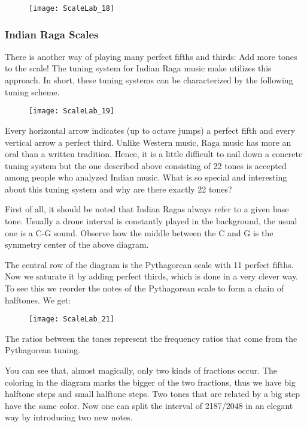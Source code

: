 \begin{figure}[h]
\centering
\texttt{[image: ScaleLab\_18]}
\end{figure}

\subsubsection{Indian Raga Scales}
There is another way of playing many perfect fifths and thirds: Add more tones to the scale!  The tuning system for Indian Raga music make utilizes this approach. In short, these tuning systems can be characterized by the following tuning scheme. 

\begin{figure}[h]
\centering
\texttt{[image: ScaleLab\_19]}
\end{figure}


Every horizontal arrow indicates (up to octave jumps) a perfect fifth and every vertical arrow a perfect third. Unlike Western music, Raga music has more an oral than a written tradition. Hence, it is a little difficult to nail down a concrete tuning system but the one described above consisting of 22 tones is accepted among people who analyzed Indian music. What is so special and interesting about this tuning system and why are there exactly 22 tones? 

First of all, it should be noted that Indian Ragas always refer to a given base tone. Usually a drone interval is constantly played in the background, the usual one is a C-G sound. Observe how the middle between the C and G is the symmetry center of the above diagram.

The central row of the diagram is the Pythagorean scale with 11 perfect fifths. Now we saturate it by adding perfect thirds, which is done in a very clever way. To see this we reorder the notes of the Pythagorean scale to form a chain of halftones. We get:

\begin{figure}[h]
\centering
\texttt{[image: ScaleLab\_21]}
\end{figure}

The ratios between the tones represent the frequency ratios that come from the Pythagorean tuning. 

You can see that, almost magically, only two kinds of fractions occur. The coloring in the diagram marks the bigger of the two fractions, thus we have big halftone steps and small halftone steps. Two tones that are related by a big step have the same color. Now one can split the interval of 2187/2048 in an elegant way by introducing two new notes. 

